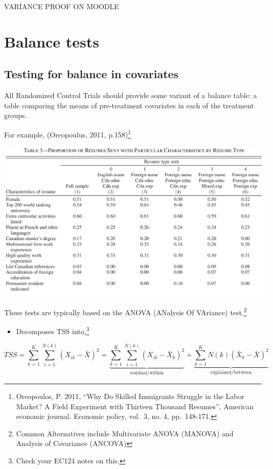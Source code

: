 \documentclass[
  letterpaper,
  DIV=11,
  numbers=noendperiod]{scrreprt}
\providecommand{\tightlist}{%
  \setlength{\itemsep}{0pt}\setlength{\parskip}{0pt}}\usepackage{longtable,booktabs,array}
\theoremstyle{definition}
\theoremstyle{remark}
\begin{document}
VARIANCE PROOF ON MOODLE

\hypertarget{balance-tests}{%
\section{Balance tests}\label{balance-tests}}

\hypertarget{testing-for-balance-in-covariates}{%
\subsection{Testing for balance in
covariates}\label{testing-for-balance-in-covariates}}

All Randomized Control Trials should provide some variant of a balance
table: a table comparing the means of pre-treatment covariates in each
of the treatment groups.

For example, (Oreopoulus, 2011, p.158)\footnote{Oreopoulos, P. 2011,
  ``Why Do Skilled Immigrants Struggle in the Labor Market? A Field
  Experiment with Thirteen Thousand Resumes'', American economic
  journal. Economic policy, vol.~3, no. 4, pp.~148-171.}

\includegraphics{Images/Oreopoulus_Balance_1.png}

These tests are typically based on the ANOVA ({AN}alysis {O}f
{VA}riance) test.\footnote{Common Alternatives include Multivariate
  ANOVA (MANOVA) and Analysis of Covariance (ANCOVA)}

\begin{itemize}
\tightlist
\item
  Decomposes TSS into,\footnote{Check your EC124 notes on this.}
\end{itemize}

\[
                TSS = \sum_{k=1}^{K}\sum_{i=1}^{N(k)}(X_{ik}-\bar{X})^2 = \underbrace{\sum_{k=1}^{K}\sum_{i=1}^{N(k)}(X_{ik}-\bar{X}_k)^2}_\text{residual/within}+\underbrace{\sum_{k=1}^{K}N(k)(\bar{X}_k-\bar{X})^2}_\text{explained/between}
\]
\end{document}

